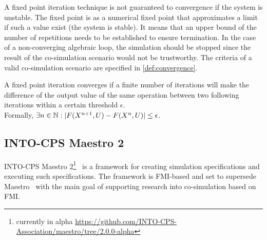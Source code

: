 

A fixed point iteration technique is not guaranteed to convergence if the system is unstable. The fixed point is as a numerical fixed point that approximates a limit if such a value exist (the system is stable). It means that an upper bound of the number of repetitions needs to be established to ensure termination. In the case of a non-converging algebraic loop, the simulation should be stopped since the result of the co-simulation scenario would not be trustworthy. The criteria of a valid co-simulation scenario are specified in \cref{def:convergence}.

\begin{definition}\label{def:convergence}
A fixed point iteration converges if a finite number of iterations will make the difference of the output value of the same operation between two following iterations within a certain threshold $\epsilon$.\\
Formally, 
$\exists n \in \mathbb{N}: |F(X^{n+1}, U) - F(X^{n}, U)| \leq \epsilon$.
\end{definition}

\subsection{INTO-CPS Maestro 2}
INTO-CPS Maestro 2\footnote{currently in alpha \url{https://github.com/INTO-CPS-Association/maestro/tree/2.0.0-alpha}}~\cite{Thule2019b} is a framework for creating simulation specifications and executing such specifications. The framework is FMI-based and set to supersede Maestro~\cite{Maestro} with the main goal of supporting research into co-simulation based on FMI. 

